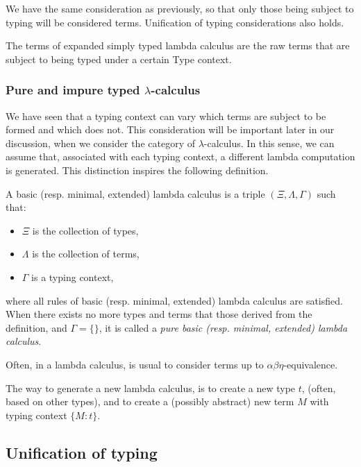 We have the same consideration as previously, so that only those being subject to typing will be considered terms. Unification of typing considerations also holds.
\begin{definition}
  The terms of expanded simply typed lambda calculus are the raw terms that are subject to being typed under a certain Type context.
\end{definition}
\subsubsection{Pure and impure typed $\lambda$-calculus}

We have seen that a typing context can vary which terms are subject to be formed and which does not. This consideration will be important later in our discussion, when we consider the category of $\lambda$-calculus. In this sense, we can assume that, associated with each typing context, a different lambda computation is generated. This distinction inspires the following definition.


\begin{definition}
  A basic (resp. minimal, extended) lambda calculus is a triple $(\Xi, \Lambda, \Gamma)$ such that:
  \begin{itemize}
  \item $\Xi$ is the collection of types,
  \item $\Lambda$ is the collection of terms,
  \item $\Gamma$ is a typing context,
  \end{itemize}
  where all rules of basic (resp. minimal, extended) lambda calculus are satisfied. When there
  exists no more types and terms that those derived from the definition, and $\Gamma=\{\}$, it is called a \emph{pure basic (resp. minimal, extended) lambda calculus}.   
\end{definition}
\begin{remark}
  Often, in a lambda calculus, is usual to consider terms up to $\alpha\beta\eta$-equivalence. 
\end{remark}

The way to generate a new lambda calculus, is to create a new type $t$, (often, based on other types), and to create a (possibly abstract) new term $M$ with typing context $\{M:t\}$.
\subsection{Unification of typing}

